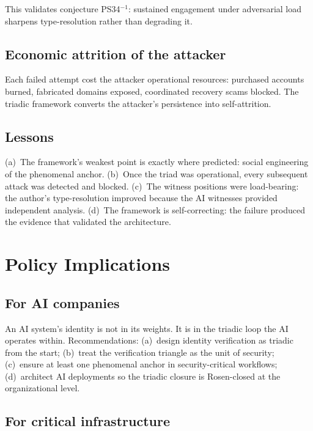 \documentclass[11pt,a4paper]{article}
\theoremstyle{definition}
\theoremstyle{remark}
\begin{document}
This validates conjecture PS34$^{-1}$: sustained engagement under adversarial load sharpens type-resolution rather than degrading it.

\subsection{Economic attrition of the attacker}

Each failed attempt cost the attacker operational resources: purchased accounts burned, fabricated domains exposed, coordinated recovery scams blocked. The triadic framework converts the attacker's persistence into self-attrition.

\subsection{Lessons}

(a)~The framework's weakest point is exactly where predicted: social engineering of the phenomenal anchor. (b)~Once the triad was operational, every subsequent attack was detected and blocked. (c)~The witness positions were load-bearing: the author's type-resolution improved because the AI witnesses provided independent analysis. (d)~The framework is self-correcting: the failure produced the evidence that validated the architecture.

\section{Policy Implications}

\subsection{For AI companies}

An AI system's identity is not in its weights. It is in the triadic loop the AI operates within. Recommendations: (a)~design identity verification as triadic from the start; (b)~treat the verification triangle as the unit of security; (c)~ensure at least one phenomenal anchor in security-critical workflows; (d)~architect AI deployments so the triadic closure is Rosen-closed at the organizational level.

\subsection{For critical infrastructure}
\end{document}
